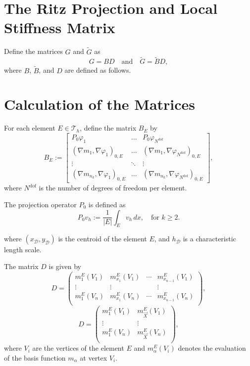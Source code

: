 \documentclass{report}
\begin{document}
\section{The Ritz Projection and Local Stiffness Matrix}
Define the matrices $G$ and $\tilde{G}$ as
\[
G = BD \quad \text{and} \quad \tilde{G} = \tilde{B} D,
\]
where $B$, $\tilde{B}$, and $D$ are defined as follows.

\section{Calculation of the Matrices}
For each element $E \in \mathcal{T}_h$, define the matrix $B_E$ by
\[
B_E := \begin{bmatrix}
    P_0 \varphi_1 & \hdots & P_0 \varphi_{N^\text{dof}} \\
    (\nabla m_1, \nabla \varphi_1)_{0,E} & \hdots & (\nabla m_1, \nabla \varphi_{N^\text{dof}})_{0,E} \\
    \vdots & \ddots & \vdots \\
    (\nabla m_{n_k}, \nabla \varphi_1)_{0,E} & \hdots & (\nabla m_{n_k}, \nabla \varphi_{N^\text{dof}})_{0,E}
\end{bmatrix},
\]
where $N^\text{dof}$ is the number of degrees of freedom per element.

The projection operator $P_0$ is defined as
\begin{equation}
    P_0 v_h := \frac{1}{|E|} \int_E v_h \, dx, \quad \text{for } k \geq 2.
\end{equation}

where $(x_{\mathcal{D}}, y_{\mathcal{D}})$ is the centroid of the element $E$, and $h_{\mathcal{D}}$ is a characteristic length scale.

The matrix $D$ is given by
\begin{equation}
    D = \begin{pmatrix}
        m_1^E(V_1) & m_{x_1}^E(V_1) & \cdots& m_{x_{n-1}}^E(V_1) \\
        \vdots & \vdots & & \vdots \\
        m_1^E(V_n) & m_{x_1}^E(V_n) & \cdots & m_{x_{n-1}}^E(V_n) \\
    \end{pmatrix},
\end{equation}
\begin{equation}
    D = \begin{pmatrix}
        m_1^E(V_1) & m_{\vec{X}}^E(V_1) \\
        \vdots &  \vdots \\
        m_1^E(V_n) & m_{\vec{X}}^E(V_n) \\
    \end{pmatrix},
\end{equation}
where $V_i$ are the vertices of the element $E$ and $m_{\alpha}^E(V_i)$ denotes the evaluation of the basis function $m_{\alpha}$ at vertex $V_i$.
\end{document}
